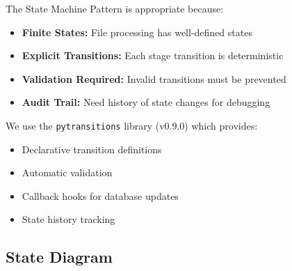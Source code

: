 \documentclass[11pt,a4paper]{article}
\begin{document}
The State Machine Pattern is appropriate because:

\begin{itemize}
    \item \textbf{Finite States:} File processing has well-defined states
    \item \textbf{Explicit Transitions:} Each stage transition is deterministic
    \item \textbf{Validation Required:} Invalid transitions must be prevented
    \item \textbf{Audit Trail:} Need history of state changes for debugging
\end{itemize}

We use the \texttt{pytransitions} library (v0.9.0) which provides:
\begin{itemize}
    \item Declarative transition definitions
    \item Automatic validation
    \item Callback hooks for database updates
    \item State history tracking
\end{itemize}

\subsection{State Diagram}
\end{document}
